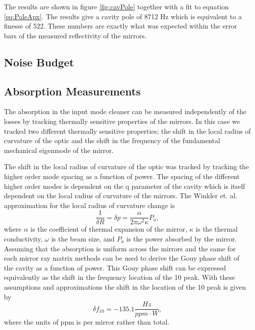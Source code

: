 \documentclass[10pt,a4paper]{article}
\begin{document}
The results are shown in figure \ref{fig:cavPole} together with a fit to equation 
\eqref{eq:PoleApx}.  The results give a cavity pole of 8712 Hz which is equivalent 
to a finesse of 522.  
These numbers are exactly what was expected within the error bars of the measured 
reflectivity of the mirrors.  

\subsection{Noise Budget}

\subsection{Absorption Measurements}
The absorption in the input mode cleaner can be measured independently of the losses 
by tracking thermally sensitive properties of the mirrors.  
In this case we tracked two different thermally sensitive properties; 
the shift in the local radius of curvature of the optic 
and the shift in the frequency of the fundamental mechanical eigenmode of the mirror.  

The shift in the local radius of curvature of the optic was tracked by 
tracking the higher order mode spacing as a function of power.  
The spacing of the different higher order modes is dependent on the q 
parameter of the cavity which is itself dependent on the local radius of 
curvature of the mirrors.  
The Winkler et. al.\cite{Winkler1991} approximation for the local radius of 
curvature change is
\begin{equation}
	\frac{1}{\delta R}=\delta p=\frac{\alpha}{2\pi\omega^2\kappa}P_a,
\end{equation}
where $\alpha$ is the coefficient of thermal expansion of the mirror,  
$\kappa$ is the thermal conductivity, $\omega$ is the beam size, and
$P_a$ is the power absorbed by the mirror.  
Assuming that the absorption is uniform across the mirrors and the same for 
each mirror ray matrix methods can be used to derive the Gouy phase shift 
of the cavity as a function of power.  
This Gouy phase shift can be expressed equivalently as the shift in the 
frequency location of the 10 peak.  
With these assumptions and approximations the shift in the location of the 10 
peak is given by 
\begin{equation}
	\delta f_{10}=-135.1 \frac{Hz}{ppm\cdot W},
\end{equation}
where the units of ppm is per mirror rather than total.
\end{document}
